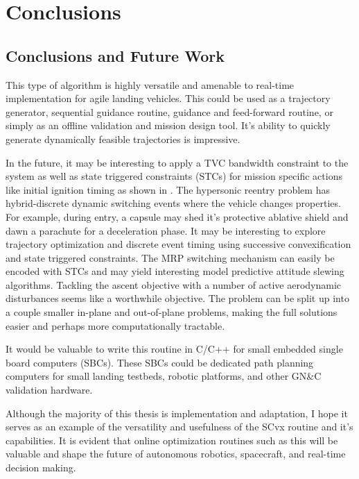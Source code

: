 \chapter{Conclusions}
\label{conclusions}

\section{Conclusions and Future Work}
This type of algorithm is highly versatile and amenable to real-time implementation for agile landing vehicles. This could be used as a trajectory generator, sequential guidance routine, guidance and feed-forward routine, or simply as an offline validation and mission design tool. It's ability to quickly generate dynamically feasible trajectories is impressive.

In the future, it may be interesting to apply a TVC bandwidth constraint to the system as well as state triggered constraints (STCs) for mission specific actions like initial ignition timing as shown in \cite{szmuk2018successivestcs}. The hypersonic reentry problem has hybrid-discrete dynamic switching events where the vehicle changes properties. For example, during entry, a capsule may shed it's protective ablative shield and dawn a parachute for a deceleration phase. It may be interesting to explore trajectory optimization and discrete event timing using successive convexification and state triggered constraints. The MRP switching mechanism can easily be encoded with STCs and may yield interesting model predictive attitude slewing algorithms. Tackling the ascent objective with a number of active aerodynamic disturbances seems like a worthwhile objective. The problem can be split up into a couple smaller in-plane and out-of-plane problems, making the full solutions easier and perhaps more computationally tractable.

It would be valuable to write this routine in C/C++ for small embedded single board computers (SBCs). These SBCs could be dedicated path planning computers for small landing testbeds, robotic platforms, and other GN\&C validation hardware.


Although the majority of this thesis is implementation and adaptation, I hope it serves as an example of the versatility and usefulness of the SCvx routine and it's capabilities. It is evident that online optimization routines such as this will be valuable and shape the future of autonomous robotics, spacecraft, and real-time decision making.